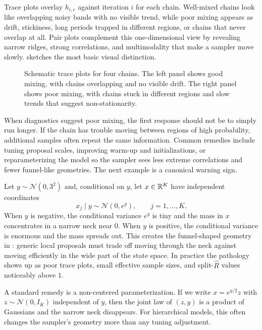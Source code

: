 Trace plots overlay $h_{i,c}$ against iteration $i$ for each chain.
Well-mixed chains look like overlapping noisy bands with no visible trend, while poor mixing appears as drift, stickiness, long periods trapped in different regions, or chains that never overlap at all.
Pair plots complement this one-dimensional view by revealing narrow ridges, strong correlations, and multimodality that make a sampler move slowly.
 sketches the most basic visual distinction.

\begin{figure}[t]
  \centering
  
  \caption{Schematic trace plots for four chains.
  The left panel shows good mixing, with chains overlapping and no visible drift.
  The right panel shows poor mixing, with chains stuck in different regions and slow trends that suggest non-stationarity.}
  \label{fig:mcmc-traceplots}
\end{figure}

When diagnostics suggest poor mixing, the first response should not be to simply run longer.
If the chain has trouble moving between regions of high probability, additional samples often repeat the same information.
Common remedies include tuning proposal scales, improving warm-up and initializations, or reparameterizing the model so the sampler sees less extreme correlations and fewer funnel-like geometries.
The next example is a canonical warning sign.

\begin{example}
Let $y\sim \mathcal{N}(0,3^2)$ and, conditional on $y$, let $x\in\mathbb{R}^K$ have independent coordinates
\[
  x_j \mid y \sim \mathcal{N}\!\left(0,e^{y}\right),
  \qquad
  j=1,\dots,K.
\]
When $y$ is negative, the conditional variance $e^{y}$ is tiny and the mass in $x$ concentrates in a narrow neck near $0$.
When $y$ is positive, the conditional variance is enormous and the mass spreads out.
This creates the funnel-shaped geometry in : generic local proposals must trade off moving through the neck against moving efficiently in the wide part of the state space.
In practice the pathology shows up as poor trace plots, small effective sample sizes, and split-$\hat R$ values noticeably above $1$.

A standard remedy is a non-centered parameterization.
If we write $x=e^{y/2}z$ with $z\sim \mathcal{N}(0,I_K)$ independent of $y$, then the joint law of $(z,y)$ is a product of Gaussians and the narrow neck disappears.
For hierarchical models, this often changes the sampler's geometry more than any tuning adjustment.
\end{example}

